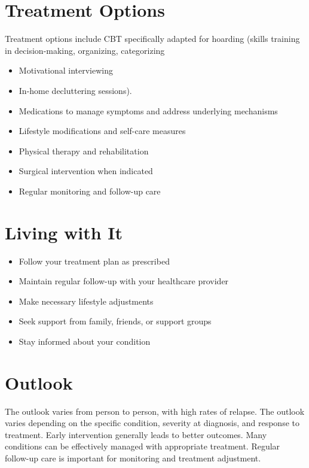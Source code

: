 \section{Treatment Options}
Treatment options include CBT specifically adapted for hoarding (skills training in decision-making, organizing, categorizing

\begin{itemize}[noitemsep]
  \item Motivational interviewing
  \item In-home decluttering sessions).
  \item Medications to manage symptoms and address underlying mechanisms
  \item Lifestyle modifications and self-care measures
  \item Physical therapy and rehabilitation
  \item Surgical intervention when indicated
  \item Regular monitoring and follow-up care
\end{itemize}
\section{Living with It}
\begin{itemize}[noitemsep]
  \item Follow your treatment plan as prescribed
  \item Maintain regular follow-up with your healthcare provider
  \item Make necessary lifestyle adjustments
  \item Seek support from family, friends, or support groups
  \item Stay informed about your condition
\end{itemize}
\section{Outlook}
The outlook varies from person to person, with high rates of relapse. The outlook varies depending on the specific condition, severity at diagnosis, and response to treatment. Early intervention generally leads to better outcomes. Many conditions can be effectively managed with appropriate treatment. Regular follow-up care is important for monitoring and treatment adjustment.
